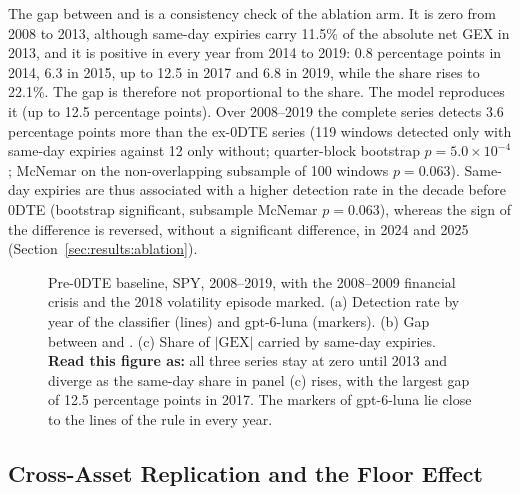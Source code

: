 The gap between  and  is a consistency check of the ablation arm. It is zero from 2008 to 2013, although same-day expiries carry 11.5\% of the absolute net GEX in 2013, and it is positive in every year from 2014 to 2019: 0.8 percentage points in 2014, 6.3 in 2015, up to 12.5 in 2017 and 6.8 in 2019, while the share rises to 22.1\%. The gap is therefore not proportional to the share. The model reproduces it (up to 12.5 percentage points). Over 2008--2019 the complete series detects 3.6 percentage points more than the ex-0DTE series (119 windows detected only with same-day expiries against 12 only without; quarter-block bootstrap $p=5.0\times10^{-4}$; McNemar on the non-overlapping subsample of 100 windows $p=0.063$). Same-day expiries are thus associated with a higher detection rate in the decade before 0DTE (bootstrap significant, subsample McNemar $p=0.063$), whereas the sign of the difference is reversed, without a significant difference, in 2024 and 2025 (Section~\ref{sec:results:ablation}).

\begin{figure}[H]
\centering
\resultfigure{\figDeep}
\caption{Pre-0DTE baseline, SPY, 2008--2019, with the 2008--2009 financial crisis and the 2018 volatility episode marked. (a) Detection rate by year of the classifier (lines) and gpt-6-luna (markers). (b) Gap between  and . (c) Share of $|\mathrm{GEX}|$ carried by same-day expiries. \textbf{Read this figure as:} all three series stay at zero until 2013 and diverge as the same-day share in panel (c) rises, with the largest gap of 12.5 percentage points in 2017. The markers of gpt-6-luna lie close to the lines of the rule in every year.}
\label{fig:deep}
\end{figure}

\subsection{Cross-Asset Replication and the Floor Effect}
\label{sec:results:cross}


